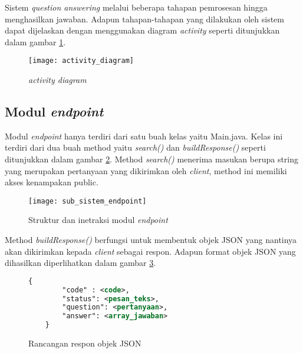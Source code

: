 Sistem \emph{question answering} melalui beberapa tahapan pemrosesan hingga menghasilkan jawaban. Adapun tahapan-tahapan yang dilakukan oleh sistem dapat dijelaskan dengan menggunakan diagram \emph{activity} seperti ditunjukkan dalam gambar \ref{fig:activity_diagram}.

\begin{figure}[hb]
    \centering
    \texttt{[image: activity\_diagram]}
    \caption{\emph{activity diagram}}
    \label{fig:activity_diagram}
\end{figure}


\subsection{Modul \emph{endpoint}}
Modul \emph{endpoint} hanya terdiri dari satu buah kelas yaitu Main.java. Kelas ini terdiri dari dua buah method yaitu \emph{search()} dan \emph{buildResponse()} seperti ditunjukkan dalam gambar \ref{fig:sub_sistem_endpoint}. Method \emph{search()} menerima masukan berupa string yang merupakan pertanyaan yang dikirimkan oleh \emph{client}, method ini memiliki akses kenampakan public.

\begin{figure}[hb]
    \centering
    \texttt{[image: sub\_sistem\_endpoint]}
    \caption{Struktur dan inetraksi modul \emph{endpoint}} 
    \label{fig:sub_sistem_endpoint}
\end{figure}

Method \emph{buildResponse()} berfungsi untuk membentuk objek JSON yang nantinya akan dikirimkan kepada \emph{client} sebagai respon. Adapun format objek JSON yang dihasilkan diperlihatkan dalam gambar \ref{fig:json_response_object}.

\begin{figure}[hb]
    \centering
    \begin{lstlisting}[language=XML,xleftmargin=0pt]
    {
        "code" : <code>,
        "status": <pesan_teks>,
        "question": <pertanyaan>,
        "answer": <array_jawaban>
    }
\end{lstlisting}
    \caption{Rancangan respon objek JSON}
    \label{fig:json_response_object}
\end{figure}

